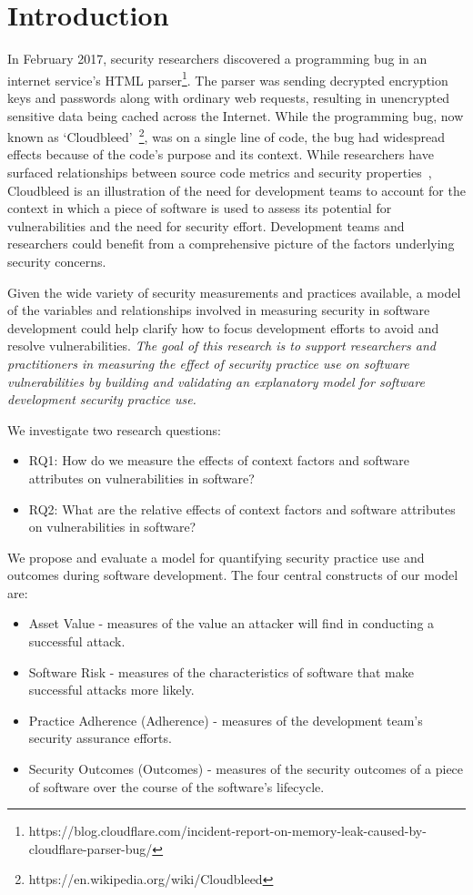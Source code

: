 \section{Introduction}
\label{sec:intro}

In February 2017, security researchers discovered a programming bug in an internet service's HTML parser\footnote{https://blog.cloudflare.com/incident-report-on-memory-leak-caused-by-cloudflare-parser-bug/}. The parser was sending decrypted encryption keys and passwords along with ordinary web requests, resulting in unencrypted sensitive data being cached across the Internet. While the programming bug, now known as `Cloudbleed'~\footnote{https://en.wikipedia.org/wiki/Cloudbleed}, was on a single line of code, the bug had widespread effects because of the code's purpose and its context.   While researchers have surfaced relationships between source code metrics and security properties~\cite{zimmerman2010searching,alhazmi2007measuring,meneely2013when,shin2011evaluating}, Cloudbleed is an illustration of the need for development teams to account for the context in which a piece of software is used to assess its potential for vulnerabilities and the need for security effort.  Development teams and researchers could benefit from a comprehensive picture of the factors underlying security concerns.

Given the wide variety of security measurements and practices available, a model of the variables and relationships involved in measuring security in software development could help clarify how to focus development efforts to avoid and resolve vulnerabilities. \textit{The goal of this research is to support researchers and practitioners in measuring the effect of security practice use on software vulnerabilities by building and validating an explanatory model for software development security practice use.}
 
We investigate two research questions:
\begin{itemize}
\item RQ1: How do we measure the effects of context factors and software attributes on vulnerabilities in software? 
\item RQ2: What are the relative effects of context factors and software attributes on vulnerabilities in software?
\end{itemize}

We propose and evaluate a model for quantifying security practice use and outcomes during software development. The four central constructs of our model are:
\begin{itemize}
	\item Asset Value - measures of the value an attacker will find in conducting a successful attack.
	\item Software Risk - measures of the characteristics of software that make successful attacks more likely.
	\item Practice Adherence (Adherence) - measures of the development team's security assurance efforts. 
	\item Security Outcomes (Outcomes) - measures of the security outcomes of a piece of software over the course of the software's lifecycle.
\end{itemize}
	
